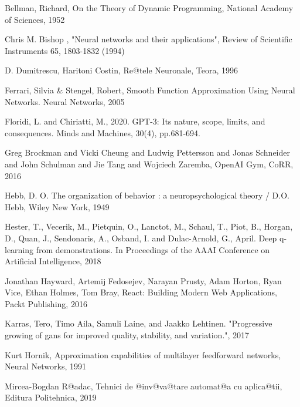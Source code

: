 


\begin{thebibliography}{99}

 Bellman, Richard, On the Theory of Dynamic Programming, National Academy of Sciences, 1952

 Chris M. Bishop , "Neural networks and their applications", Review of Scientific Instruments 65, 1803-1832 (1994)

 D. Dumitrescu, Haritoni Costin, Re@tele Neuronale, Teora, 1996

	Ferrari, Silvia \& Stengel, Robert, Smooth Function Approximation Using Neural Networks. Neural Networks, 2005 

 Floridi, L. and Chiriatti, M., 2020. GPT-3: Its nature, scope, limits, and consequences. Minds and Machines, 30(4), pp.681-694.

 Greg Brockman and Vicki Cheung and Ludwig Pettersson and Jonas Schneider and John Schulman and Jie Tang and Wojciech Zaremba, OpenAI Gym, CoRR, 2016

 Hebb, D. O.  The organization of behavior : a neuropsychological theory / D.O. Hebb, Wiley New York, 1949

 Hester, T., Vecerik, M., Pietquin, O., Lanctot, M., Schaul, T., Piot, B., Horgan, D., Quan, J., Sendonaris, A., Osband, I. and Dulac-Arnold, G.,  April. Deep q-learning from demonstrations. In Proceedings of the AAAI Conference on Artificial Intelligence, 2018 

 Jonathan Hayward, Artemij Fedosejev, Narayan Prusty, Adam Horton, Ryan Vice, Ethan Holmes, Tom Bray, React: Building Modern Web Applications, Packt Publishing, 2016

 Karras, Tero, Timo Aila, Samuli Laine, and Jaakko Lehtinen. "Progressive growing of gans for improved quality, stability, and variation.", 2017

 Kurt Hornik, Approximation capabilities of multilayer feedforward networks, Neural Networks, 1991

 Mircea-Bogdan R@adac, Tehnici de @inv@va@tare automat@a cu aplica@tii, Editura Politehnica, 2019 


\end{thebibliography}
